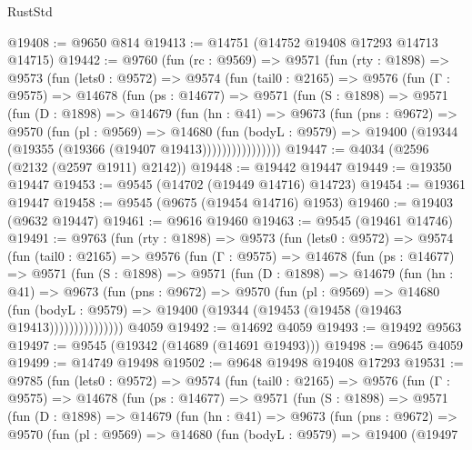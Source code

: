 \begin{lexlean}{RustStd}
\begin{coremodule}
@19408 := @9650 @814
@19413 := @14751 (@14752 @19408 @17293 @14713 @14715)
@19442 := @9760
    (fun (rc : @9569) =>
    @9571
      (fun (rty : @1898) =>
      @9573
        (fun (lets0 : @9572) =>
        @9574
          (fun (tail0 : @2165) =>
          @9576
            (fun (Γ : @9575) =>
            @14678
              (fun (ps : @14677) =>
              @9571
                (fun (S : @1898) =>
                @9571
                  (fun (D : @1898) =>
                  @14679
                    (fun (hn : @41) =>
                    @9673
                      (fun (pns : @9672) =>
                      @9570
                        (fun (pl : @9569) =>
                        @14680
                          (fun (bodyL : @9579) =>
                          @19400 (@19344 (@19355 (@19366 (@19407 @19413))))))))))))))))
@19447 := @4034 (@2596 (@2132 (@2597 @1911) @2142))
@19448 := @19442 @19447
@19449 := @19350 @19447
@19453 := @9545 (@14702 (@19449 @14716) @14723)
@19454 := @19361 @19447
@19458 := @9545 (@9675 (@19454 @14716) @1953)
@19460 := @19403 (@9632 @19447)
@19461 := @9616 @19460
@19463 := @9545 (@19461 @14746)
@19491 := @9763
    (fun (rty : @1898) =>
    @9573
      (fun (lets0 : @9572) =>
      @9574
        (fun (tail0 : @2165) =>
        @9576
          (fun (Γ : @9575) =>
          @14678
            (fun (ps : @14677) =>
            @9571
              (fun (S : @1898) =>
              @9571
                (fun (D : @1898) =>
                @14679
                  (fun (hn : @41) =>
                  @9673
                    (fun (pns : @9672) =>
                    @9570
                      (fun (pl : @9569) =>
                      @14680
                        (fun (bodyL : @9579) =>
                        @19400 (@19344 (@19453 (@19458 (@19463 @19413)))))))))))))))
    @4059
@19492 := @14692 @4059
@19493 := @19492 @9563
@19497 := @9545 (@19342 (@14689 (@14691 @19493)))
@19498 := @9645 @4059
@19499 := @14749 @19498
@19502 := @9648 @19498 @19408 @17293
@19531 := @9785
    (fun (lets0 : @9572) =>
    @9574
      (fun (tail0 : @2165) =>
      @9576
        (fun (Γ : @9575) =>
        @14678
          (fun (ps : @14677) =>
          @9571
            (fun (S : @1898) =>
            @9571
              (fun (D : @1898) =>
              @14679
                (fun (hn : @41) =>
                @9673
                  (fun (pns : @9672) =>
                  @9570
                    (fun (pl : @9569) =>
                    @14680
                      (fun (bodyL : @9579) =>
                      @19400
                        (@19497

\end{coremodule}
\end{lexlean}
